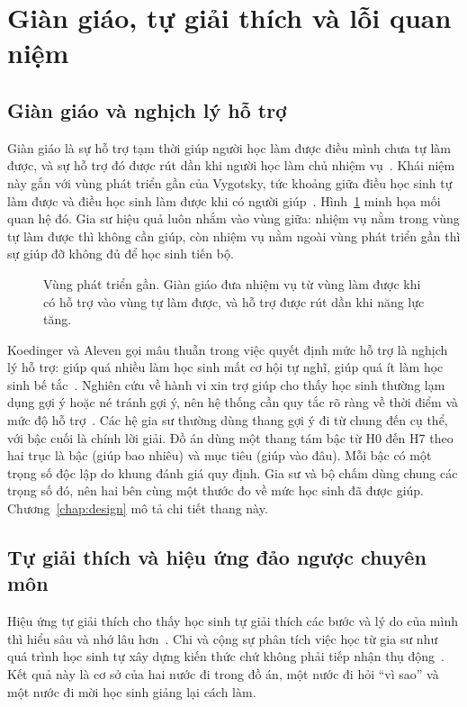 \section{Giàn giáo, tự giải thích và lỗi quan niệm}

\subsection{Giàn giáo và nghịch lý hỗ trợ}
Giàn giáo là sự hỗ trợ tạm thời giúp người học làm được điều mình chưa tự làm được, và sự hỗ trợ đó được rút dần khi người học làm chủ nhiệm vụ~\cite{wood1976}. Khái niệm này gắn với vùng phát triển gần của Vygotsky, tức khoảng giữa điều học sinh tự làm được và điều học sinh làm được khi có người giúp~\cite{vygotsky1978}. Hình~\ref{fig:zpd} minh họa mối quan hệ đó. Gia sư hiệu quả luôn nhắm vào vùng giữa: nhiệm vụ nằm trong vùng tự làm được thì không cần giúp, còn nhiệm vụ nằm ngoài vùng phát triển gần thì sự giúp đỡ không đủ để học sinh tiến bộ.

\begin{figure}[ht]
\centering

\caption{Vùng phát triển gần. Giàn giáo đưa nhiệm vụ từ vùng làm được khi có hỗ trợ vào vùng tự làm được, và hỗ trợ được rút dần khi năng lực tăng.}
\label{fig:zpd}
\end{figure}

Koedinger và Aleven gọi mâu thuẫn trong việc quyết định mức hỗ trợ là nghịch lý hỗ trợ: giúp quá nhiều làm học sinh mất cơ hội tự nghĩ, giúp quá ít làm học sinh bế tắc~\cite{koedinger2007}. Nghiên cứu về hành vi xin trợ giúp cho thấy học sinh thường lạm dụng gợi ý hoặc né tránh gợi ý, nên hệ thống cần quy tắc rõ ràng về thời điểm và mức độ hỗ trợ~\cite{aleven2016}. Các hệ gia sư thường dùng thang gợi ý đi từ chung đến cụ thể, với bậc cuối là chính lời giải. Đồ án dùng một thang tám bậc từ H0 đến H7 theo hai trục là bậc (giúp bao nhiêu) và mục tiêu (giúp vào đâu). Mỗi bậc có một trọng số độc lập do khung đánh giá quy định. Gia sư và bộ chấm dùng chung các trọng số đó, nên hai bên cùng một thước đo về mức học sinh đã được giúp. Chương~\ref{chap:design} mô tả chi tiết thang này.

\subsection{Tự giải thích và hiệu ứng đảo ngược chuyên môn}
Hiệu ứng tự giải thích cho thấy học sinh tự giải thích các bước và lý do của mình thì hiểu sâu và nhớ lâu hơn~\cite{chi1989,chi1994}. Chi và cộng sự phân tích việc học từ gia sư như quá trình học sinh tự xây dựng kiến thức chứ không phải tiếp nhận thụ động~\cite{chi2001}. Kết quả này là cơ sở của hai nước đi trong đồ án, một nước đi hỏi ``vì sao'' và một nước đi mời học sinh giảng lại cách làm.

